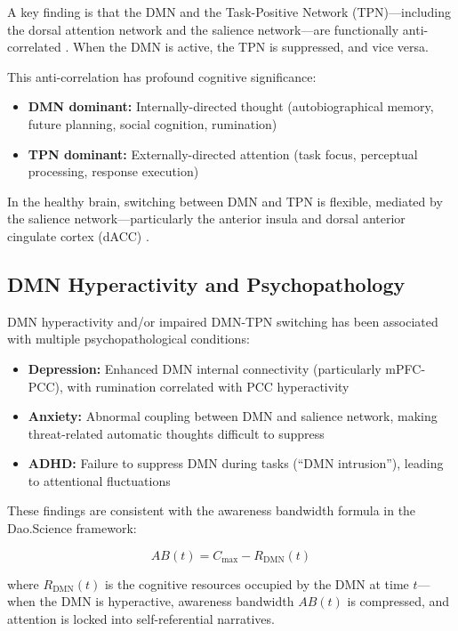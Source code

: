\documentclass[11pt,a4paper]{article}
\begin{document}
A key finding is that the DMN and the Task-Positive Network (TPN)---including the dorsal attention network and the salience network---are functionally anti-correlated \cite{Fox2005}. When the DMN is active, the TPN is suppressed, and vice versa.

This anti-correlation has profound cognitive significance:
\begin{itemize}[nosep]
    \item \textbf{DMN dominant:} Internally-directed thought (autobiographical memory, future planning, social cognition, rumination)
    \item \textbf{TPN dominant:} Externally-directed attention (task focus, perceptual processing, response execution)
\end{itemize}

In the healthy brain, switching between DMN and TPN is flexible, mediated by the salience network---particularly the anterior insula and dorsal anterior cingulate cortex (dACC) \cite{Menon2010}.

\subsection{DMN Hyperactivity and Psychopathology}

DMN hyperactivity and/or impaired DMN-TPN switching has been associated with multiple psychopathological conditions:

\begin{itemize}[nosep]
    \item \textbf{Depression:} Enhanced DMN internal connectivity (particularly mPFC-PCC), with rumination correlated with PCC hyperactivity \cite{Hamilton2011}
    \item \textbf{Anxiety:} Abnormal coupling between DMN and salience network, making threat-related automatic thoughts difficult to suppress \cite{Xu2019}
    \item \textbf{ADHD:} Failure to suppress DMN during tasks (``DMN intrusion''), leading to attentional fluctuations \cite{SonugaBarke2007}
\end{itemize}

These findings are consistent with the awareness bandwidth formula in the Dao.Science framework:

\begin{equation}
AB(t) = C_{\text{max}} - R_{\text{DMN}}(t)
\end{equation}

where $R_{\text{DMN}}(t)$ is the cognitive resources occupied by the DMN at time $t$---when the DMN is hyperactive, awareness bandwidth $AB(t)$ is compressed, and attention is locked into self-referential narratives.
\end{document}
